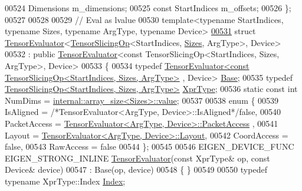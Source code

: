 \begin{DoxyCode}
00524   Dimensions m\_dimensions;
00525   \textcolor{keyword}{const} StartIndices m\_offsets;
00526 \};
00527 
00528 
00529 \textcolor{comment}{// Eval as lvalue}
00530 \textcolor{keyword}{template}<\textcolor{keyword}{typename} StartIndices, \textcolor{keyword}{typename} Sizes, \textcolor{keyword}{typename} ArgType, \textcolor{keyword}{typename} Device>
\hyperlink{struct_eigen_1_1_tensor_evaluator_3_01_tensor_slicing_op_3_01_start_indices_00_01_sizes_00_01_arg_type_01_4_00_01_device_01_4}{00531} \textcolor{keyword}{struct }\hyperlink{struct_eigen_1_1_tensor_evaluator}{TensorEvaluator}<\hyperlink{class_eigen_1_1_tensor_slicing_op}{TensorSlicingOp}<StartIndices, 
      \hyperlink{struct_eigen_1_1_sizes}{Sizes}, ArgType>, Device>
00532   : \textcolor{keyword}{public} \hyperlink{struct_eigen_1_1_tensor_evaluator}{TensorEvaluator}<const TensorSlicingOp<StartIndices, Sizes, ArgType>, Device>
00533 \{
00534   \textcolor{keyword}{typedef} \hyperlink{struct_eigen_1_1_tensor_evaluator}{TensorEvaluator<const TensorSlicingOp<StartIndices, Sizes, ArgType>}
      , Device> \hyperlink{struct_eigen_1_1_tensor_evaluator_3_01const_01_tensor_slicing_op_3_01_start_indices_00_01_sizes_ad061dd92ee73f8ad7fd3bb05ad7286d}{Base};
00535   \textcolor{keyword}{typedef} \hyperlink{class_eigen_1_1_tensor_slicing_op}{TensorSlicingOp<StartIndices, Sizes, ArgType>} 
      \hyperlink{class_eigen_1_1_tensor_slicing_op}{XprType};
00536   \textcolor{keyword}{static} \textcolor{keyword}{const} \textcolor{keywordtype}{int} NumDims = \hyperlink{struct_eigen_1_1internal_1_1array__size}{internal::array\_size<Sizes>::value};
00537 
00538   \textcolor{keyword}{enum} \{
00539     IsAligned = \textcolor{comment}{/*TensorEvaluator<ArgType, Device>::IsAligned*/}\textcolor{keyword}{false},
00540     PacketAccess = \hyperlink{struct_eigen_1_1_tensor_evaluator}{TensorEvaluator<ArgType, Device>::PacketAccess}
      ,
00541     Layout = \hyperlink{struct_eigen_1_1_tensor_evaluator}{TensorEvaluator<ArgType, Device>::Layout},
00542     CoordAccess = \textcolor{keyword}{false},
00543     RawAccess = \textcolor{keyword}{false}
00544   \};
00545 
00546   EIGEN\_DEVICE\_FUNC EIGEN\_STRONG\_INLINE \hyperlink{struct_eigen_1_1_tensor_evaluator}{TensorEvaluator}(\textcolor{keyword}{const} XprType& op, \textcolor{keyword}{const} Device& 
      device)
00547     : Base(op, device)
00548     \{ \}
00549 
00550   \textcolor{keyword}{typedef} \textcolor{keyword}{typename} XprType::Index \hyperlink{namespace_eigen_a62e77e0933482dafde8fe197d9a2cfde}{Index};

\end{DoxyCode}
